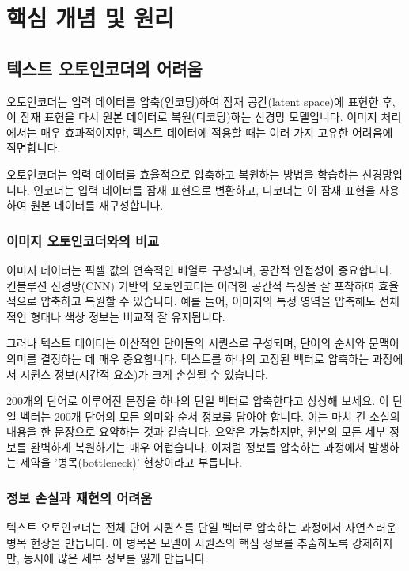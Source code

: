 \documentclass[11pt,a4paper]{article}
\theoremstyle{definition}
\begin{document}
\newpage
\section{핵심 개념 및 원리}

\subsection{텍스트 오토인코더의 어려움}
오토인코더는 입력 데이터를 압축(인코딩)하여 잠재 공간(latent space)에 표현한 후, 이 잠재 표현을 다시 원본 데이터로 복원(디코딩)하는 신경망 모델입니다. 이미지 처리에서는 매우 효과적이지만, 텍스트 데이터에 적용할 때는 여러 가지 고유한 어려움에 직면합니다.

\begin{tcolorbox}[definition={오토인코더의 기본 개념}]
오토인코더는 입력 데이터를 효율적으로 압축하고 복원하는 방법을 학습하는 신경망입니다. 인코더는 입력 데이터를 잠재 표현으로 변환하고, 디코더는 이 잠재 표현을 사용하여 원본 데이터를 재구성합니다.
\end{tcolorbox}

\subsubsection{이미지 오토인코더와의 비교}
이미지 데이터는 픽셀 값의 연속적인 배열로 구성되며, 공간적 인접성이 중요합니다. 컨볼루션 신경망(CNN) 기반의 오토인코더는 이러한 공간적 특징을 잘 포착하여 효율적으로 압축하고 복원할 수 있습니다. 예를 들어, 이미지의 특정 영역을 압축해도 전체적인 형태나 색상 정보는 비교적 잘 유지됩니다.

그러나 텍스트 데이터는 이산적인 단어들의 시퀀스로 구성되며, 단어의 순서와 문맥이 의미를 결정하는 데 매우 중요합니다. 텍스트를 하나의 고정된 벡터로 압축하는 과정에서 시퀀스 정보(시간적 요소)가 크게 손실될 수 있습니다.

\begin{tcolorbox}[example={텍스트 오토인코더의 병목 현상}]
200개의 단어로 이루어진 문장을 하나의 단일 벡터로 압축한다고 상상해 보세요. 이 단일 벡터는 200개 단어의 모든 의미와 순서 정보를 담아야 합니다. 이는 마치 긴 소설의 내용을 한 문장으로 요약하는 것과 같습니다. 요약은 가능하지만, 원본의 모든 세부 정보를 완벽하게 복원하기는 매우 어렵습니다. 이처럼 정보를 압축하는 과정에서 발생하는 제약을 '병목(bottleneck)' 현상이라고 부릅니다.
\end{tcolorbox}

\subsubsection{정보 손실과 재현의 어려움}
텍스트 오토인코더는 전체 단어 시퀀스를 단일 벡터로 압축하는 과정에서 자연스러운 병목 현상을 만듭니다. 이 병목은 모델이 시퀀스의 핵심 정보를 추출하도록 강제하지만, 동시에 많은 세부 정보를 잃게 만듭니다.
\end{document}
